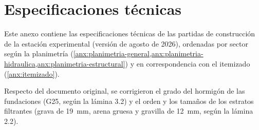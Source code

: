 \chapter{Especificaciones técnicas}
\label{anx:eett}

Este anexo contiene las especificaciones técnicas de las partidas de construcción de la estación experimental (versión de agosto de 2026), ordenadas por sector según la planimetría (\cref{anx:planimetria-general,anx:planimetria-hidraulica,anx:planimetria-estructural}) y en correspondencia con el itemizado (\cref{anx:itemizado}).

Respecto del documento original, se corrigieron el grado del hormigón de las fundaciones (G25, según la lámina 3.2) y el orden y los tamaños de los estratos filtrantes (grava de \qty{19}{\milli\meter}, arena gruesa y gravilla de \qty{12}{\milli\meter}, según la lámina 2.2).


